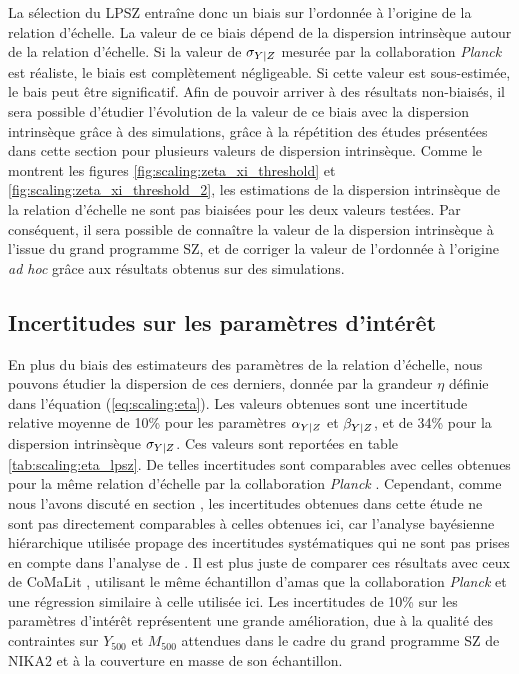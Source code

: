 La sélection du LPSZ entraîne donc un biais sur l'ordonnée à l'origine de la relation d'échelle.
La valeur de ce biais dépend de la dispersion intrinsèque autour de la relation d'échelle.
Si la valeur de $\sigma_{Y|Z}$ mesurée par la collaboration \textit{Planck} \cite{planck_collaboration_planck_2011} est réaliste, le biais est complètement négligeable.
Si cette valeur est sous-estimée, le bais peut être significatif.
Afin de pouvoir arriver à des résultats non-biaisés, il sera possible d'étudier l'évolution de la valeur de ce biais avec la dispersion intrinsèque grâce à des simulations, grâce à la répétition des études présentées dans cette section pour plusieurs valeurs de dispersion intrinsèque.
Comme le montrent les figures \ref{fig:scaling:zeta_xi_threshold} et \ref{fig:scaling:zeta_xi_threshold_2}, les estimations de la dispersion intrinsèque de la relation d'échelle ne sont pas biaisées pour les deux valeurs testées.
Par conséquent, il sera possible de connaître la valeur de la dispersion intrinsèque à l'issue du grand programme SZ, et de corriger la valeur de l'ordonnée à l'origine \textit{ad hoc} grâce aux résultats obtenus sur des simulations.

\subsection{Incertitudes sur les paramètres d'intérêt}

En plus du biais des estimateurs des paramètres de la relation d'échelle, nous pouvons étudier la dispersion de ces derniers, donnée par la grandeur $\eta$ définie dans l'équation (\ref{eq:scaling:eta}).
Les valeurs obtenues sont une incertitude relative moyenne de 10\% pour les paramètres $\alpha_{Y|Z}$ et $\beta_{Y|Z}$, et de 34\% pour la dispersion intrinsèque $\sigma_{Y|Z}$.
Ces valeurs sont reportées en table \ref{tab:scaling:eta_lpsz}.
De telles incertitudes sont comparables avec celles obtenues pour la même relation d'échelle par la collaboration \textit{Planck} \cite{planck_collaboration_planck_2011}.
Cependant, comme nous l'avons discuté en section , les incertitudes obtenues dans cette étude ne sont pas directement comparables à celles obtenues ici, car l'analyse bayésienne hiérarchique utilisée propage des incertitudes systématiques qui ne sont pas prises en compte dans l'analyse de \cite{planck_collaboration_planck_2011}.
Il est plus juste de comparer ces résultats avec ceux de CoMaLit \cite{sereno_comparing_2015}, utilisant le même échantillon d'amas que la collaboration \textit{Planck} et une régression similaire à celle utilisée ici.
Les incertitudes de 10\% sur les paramètres d'intérêt représentent une grande amélioration, due à la qualité des contraintes sur $Y_{500}$ et $M_{500}$ attendues dans le cadre du grand programme SZ de NIKA2 et à la couverture en masse de son échantillon.

